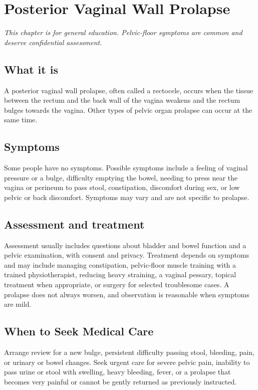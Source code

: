 \chapter{Posterior Vaginal Wall Prolapse}

\medskip
\noindent\textit{This chapter is for general education. Pelvic-floor symptoms are common and deserve confidential assessment.}

\section*{What it is}
A posterior vaginal wall prolapse, often called a rectocele, occurs when the tissue between the rectum and the back wall of the vagina weakens and the rectum bulges towards the vagina. Other types of pelvic organ prolapse can occur at the same time.

\section*{Symptoms}
Some people have no symptoms. Possible symptoms include a feeling of vaginal pressure or a bulge, difficulty emptying the bowel, needing to press near the vagina or perineum to pass stool, constipation, discomfort during sex, or low pelvic or back discomfort. Symptoms may vary and are not specific to prolapse.

\section*{Assessment and treatment}
Assessment usually includes questions about bladder and bowel function and a pelvic examination, with consent and privacy. Treatment depends on symptoms and may include managing constipation, pelvic-floor muscle training with a trained physiotherapist, reducing heavy straining, a vaginal pessary, topical treatment when appropriate, or surgery for selected troublesome cases. A prolapse does not always worsen, and observation is reasonable when symptoms are mild.

\section*{When to Seek Medical Care}
Arrange review for a new bulge, persistent difficulty passing stool, bleeding, pain, or urinary or bowel changes. Seek urgent care for severe pelvic pain, inability to pass urine or stool with swelling, heavy bleeding, fever, or a prolapse that becomes very painful or cannot be gently returned as previously instructed.


